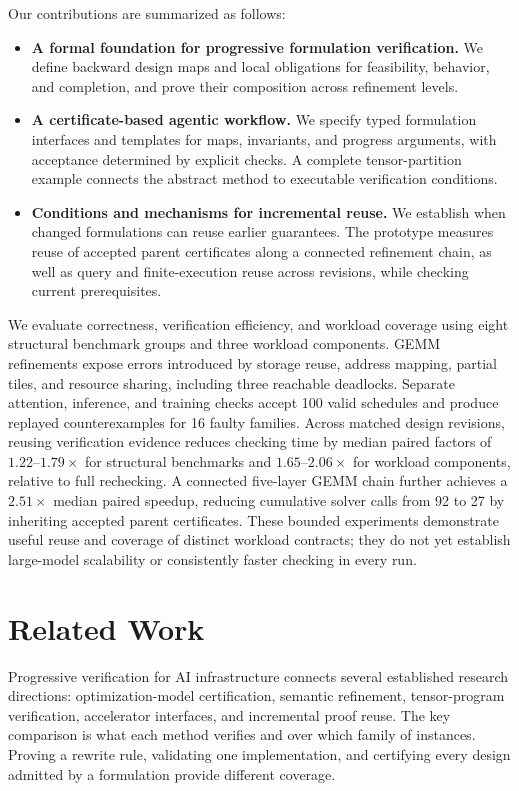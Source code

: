 \documentclass[11pt]{article}
\begin{document}
Our contributions are summarized as follows:
\begin{itemize}
\item \textbf{A formal foundation for progressive formulation verification.} We define backward design maps and local obligations for feasibility, behavior, and completion, and prove their composition across refinement levels.
\item \textbf{A certificate-based agentic workflow.} We specify typed formulation interfaces and templates for maps, invariants, and progress arguments, with acceptance determined by explicit checks. A complete tensor-partition example connects the abstract method to executable verification conditions.
\item \textbf{Conditions and mechanisms for incremental reuse.} We establish when changed formulations can reuse earlier guarantees. The prototype measures reuse of accepted parent certificates along a connected refinement chain, as well as query and finite-execution reuse across revisions, while checking current prerequisites.
\end{itemize}

We evaluate correctness, verification efficiency, and workload coverage using eight structural benchmark groups and three workload components. GEMM refinements expose errors introduced by storage reuse, address mapping, partial tiles, and resource sharing, including three reachable deadlocks. Separate attention, inference, and training checks accept 100 valid schedules and produce replayed counterexamples for 16 faulty families. Across matched design revisions, reusing verification evidence reduces checking time by median paired factors of $1.22$--$1.79\times$ for structural benchmarks and $1.65$--$2.06\times$ for workload components, relative to full rechecking. A connected five-layer GEMM chain further achieves a $2.51\times$ median paired speedup, reducing cumulative solver calls from 92 to 27 by inheriting accepted parent certificates. These bounded experiments demonstrate useful reuse and coverage of distinct workload contracts; they do not yet establish large-model scalability or consistently faster checking in every run.

\section{Related Work}
Progressive verification for AI infrastructure connects several established research directions: optimization-model certification, semantic refinement, tensor-program verification, accelerator interfaces, and incremental proof reuse. The key comparison is what each method verifies and over which family of instances. Proving a rewrite rule, validating one implementation, and certifying every design admitted by a formulation provide different coverage.
\end{document}
